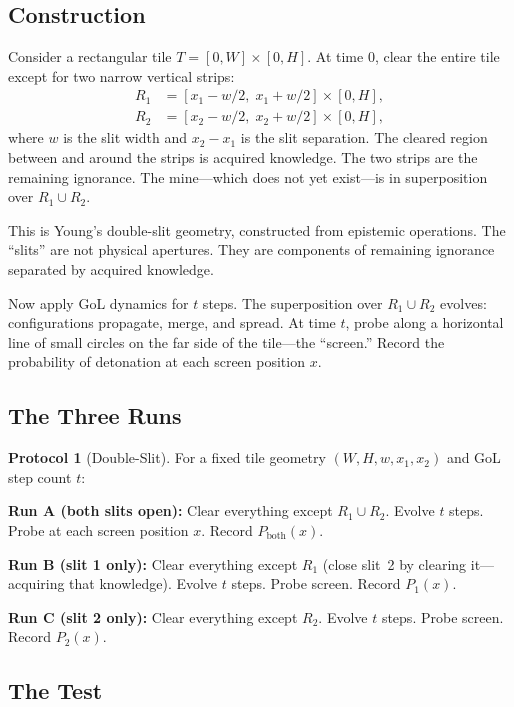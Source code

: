 \documentclass[12pt,a4paper]{article}
\theoremstyle{definition}
\newtheorem{protocol}[theorem]{Protocol}
\theoremstyle{remark}
\begin{document}
\subsection{Construction}
\label{sec:slit-construction}

Consider a rectangular tile $T = [0, W] \times [0, H]$.  At time $0$, clear the entire tile except for two narrow vertical strips:
\begin{align*}
  R_1 &= [x_1 - w/2,\; x_1 + w/2] \times [0, H], \\
  R_2 &= [x_2 - w/2,\; x_2 + w/2] \times [0, H],
\end{align*}
where $w$ is the slit width and $x_2 - x_1$ is the slit separation.  The cleared region between and around the strips is acquired knowledge.  The two strips are the remaining ignorance.  The mine---which does not yet exist---is in superposition over $R_1 \cup R_2$.

This is Young's double-slit geometry, constructed from epistemic operations.  The ``slits'' are not physical apertures.  They are components of remaining ignorance separated by acquired knowledge.

Now apply GoL dynamics for $t$ steps.  The superposition over $R_1 \cup R_2$ evolves: configurations propagate, merge, and spread.  At time $t$, probe along a horizontal line of small circles on the far side of the tile---the ``screen.''  Record the probability of detonation at each screen position $x$.

\subsection{The Three Runs}

\begin{protocol}[Double-Slit]
\label{prot:double-slit}
For a fixed tile geometry $(W, H, w, x_1, x_2)$ and GoL step count $t$:

\textbf{Run A (both slits open):}  Clear everything except $R_1 \cup R_2$.  Evolve $t$ steps.  Probe at each screen position $x$.  Record $P_{\text{both}}(x)$.

\textbf{Run B (slit 1 only):}  Clear everything except $R_1$ (close slit~2 by clearing it---acquiring that knowledge).  Evolve $t$ steps.  Probe screen.  Record $P_1(x)$.

\textbf{Run C (slit 2 only):}  Clear everything except $R_2$.  Evolve $t$ steps.  Probe screen.  Record $P_2(x)$.
\end{protocol}

\subsection{The Test}
\end{document}
